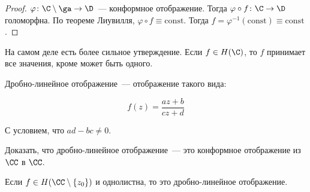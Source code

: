 \begin{proof}
    $\varphi\colon \C\setminus\ga\to\D$~--- конформное отображение.
    Тогда $\varphi \circ f\colon \C \to \D$ голоморфна.
    По теореме Лиувилля, $\varphi \circ f \equiv \mathrm{const}$.
    Тогда $f = \varphi^{-1}(\mathrm{const}) \equiv \mathrm{const}$.
\end{proof}
  
\begin{observation}
    На самом деле есть более сильное утверждение.
    Если $f \in H(\C)$, то $f$ принимает все значения, кроме
    может быть одного.
\end{observation}

\begin{definition}
    Дробно-линейное отображение~--- отображение такого вида:

    \[
        f(z) = \frac{az + b}{cz + d}
    \]

    С условием, что $ad - bc \ne 0$.
\end{definition}

\begin{exercise}
    Доказать, что дробно-линейное отображение~--- это конформное
    отображение из $\CC$ в $\CC$.
\end{exercise}

\begin{theorem}
    Если $f \in H(\CC \setminus \{ z_0 \})$ и однолистна,
    то это дробно-линейное отображение.
\end{theorem}

